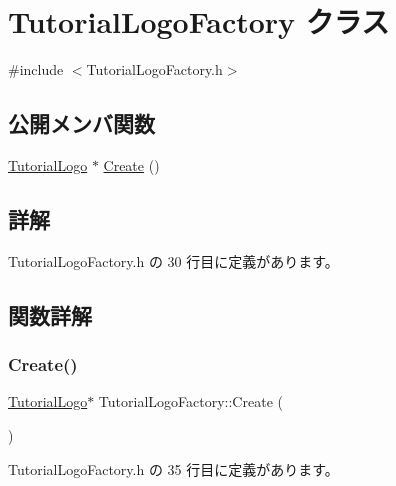 \hypertarget{class_tutorial_logo_factory}{}\section{Tutorial\+Logo\+Factory クラス}
\label{class_tutorial_logo_factory}


{\ttfamily \#include $<$Tutorial\+Logo\+Factory.\+h$>$}

\subsection*{公開メンバ関数}
\begin{DoxyCompactItemize}
\item 
\mbox{\hyperlink{class_tutorial_logo}{Tutorial\+Logo}} $\ast$ \mbox{\hyperlink{class_tutorial_logo_factory_adc1e80456f8ab75ba30c7a1e9767afd8}{Create}} ()
\end{DoxyCompactItemize}


\subsection{詳解}


 Tutorial\+Logo\+Factory.\+h の 30 行目に定義があります。



\subsection{関数詳解}
\mbox{\label{class_tutorial_logo_factory_adc1e80456f8ab75ba30c7a1e9767afd8}} 
\subsubsection{\texorpdfstring{Create()}{Create()}}
{\footnotesize\ttfamily \mbox{\hyperlink{class_tutorial_logo}{Tutorial\+Logo}}$\ast$ Tutorial\+Logo\+Factory\+::\+Create (\begin{DoxyParamCaption}{ }\end{DoxyParamCaption})\hspace{0.3cm}{\ttfamily [inline]}}



 Tutorial\+Logo\+Factory.\+h の 35 行目に定義があります。


